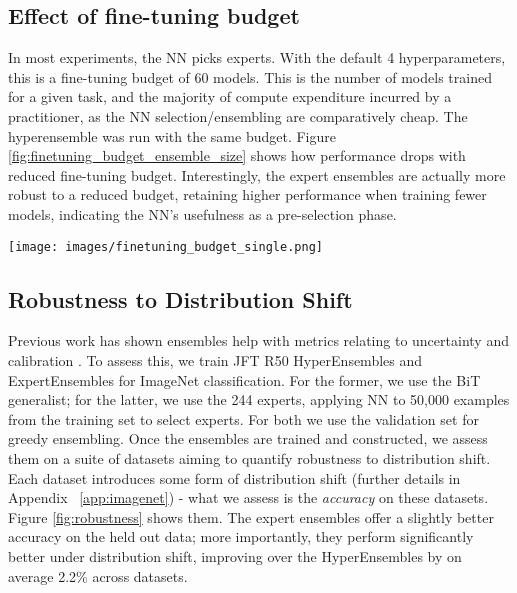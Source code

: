\documentclass{article} \usepackage{iclr2021_conference,times}
\begin{document}
\subsection{Effect of fine-tuning budget}
\noindent
\begin{minipage}{.588\textwidth}
In most experiments, the NN picks  experts. With the default 4 hyperparameters, this is a fine-tuning budget of 60 models. This is the number of models trained for a given task, and the majority of compute expenditure incurred by a practitioner, as the NN selection/ensembling are comparatively cheap. The hyperensemble was run with the same budget. Figure \ref{fig:finetuning_budget_ensemble_size} shows how performance drops with reduced fine-tuning budget. Interestingly, the expert ensembles are actually more robust to a reduced budget, retaining higher performance when training fewer models, indicating the NN's usefulness as a pre-selection phase.
\end{minipage}\hfill
\begin{minipage}{.39\textwidth}
\centering
\texttt{[image: images/finetuning\_budget\_single.png]}\hspace{-1ex}
\label{fig:finetuning_budget_ensemble_size}
\end{minipage}

\subsection{Robustness to Distribution Shift}
Previous work has shown ensembles help with metrics relating to uncertainty and calibration \citep{balaji2017ensembles,stickl2020diverse}. To assess this, we train JFT R50 HyperEnsembles and ExpertEnsembles for ImageNet classification. For the former, we use the BiT generalist; for the latter, we use the 244 experts, applying NN to 50,000 examples from the training set to select experts. For both we use the validation set for greedy ensembling.
Once the ensembles are trained and constructed, we assess them on a suite of datasets aiming to quantify robustness to distribution shift.
Each dataset introduces some form of distribution shift (further details in Appendix ~\ref{app:imagenet}) - what we assess is the \textit{accuracy} on these datasets.
Figure \ref{fig:robustness} shows them. The expert ensembles offer a slightly better accuracy on the held out data; more importantly, they perform significantly better under distribution shift, improving over the HyperEnsembles by on average 2.2\% across datasets.
\end{document}
